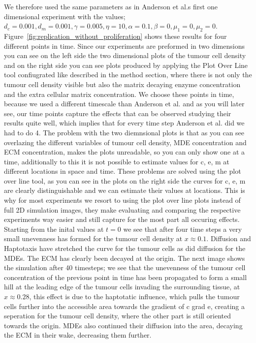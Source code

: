 We therefore used the same parameters as in Anderson et al.s first one dimensional experiment with the values; $d_c = 0.001, d_m = 0.001, \gamma = 0.005, \eta = 10, \alpha = 0.1, \beta = 0, \mu_1 = 0, \mu_2 = 0$. Figure~\ref{fig:replication_without_proliferation} shows these results for four different points in time. Since our experiments are preformed in two dimensions you can see on the left side the two dimensional plots of the tumour cell density and on the right side you can see plots produced by applying the Plot Over Line tool confiugrated like described in the method section, where there is not only the tumour cell density visible but also the matrix decaying enzyme concentration and the extra cellular matrix concentration. We choose these points in time, because we used a different timescale than Anderson et al. and as you will later see, our time points capture the effects that can be observed studying their results quite well, which implies that for every time step Anderson et al. did we had to do 4. The problem with the two diemnsional plots is that as you can see overlazing the different variables of tumour cell density, MDE concentration and ECM concentration, makes the plots unreadable, so you can only show one at a time, additionally to this it is not possible to estimate values for c, e, m at different locations in space and time. These problems are solved using the plot over line tool, as you can see in the plots on the right side the curves for c, e, m are clearly distinguishable and we can estimate their values at locations. This is why for most experiments we resort to using the plot over line plots instead of full 2D simulation images, they make evaluating and comparing the respective experiments way easier and still capture for the most part all occuring effects. 
Starting from the inital values at $t=0$ we see that after four time steps a very small unevenness has formed for the tumour cell density at $x\approx 0.1$. Diffusion and Haptotaxis have stretched the curve for the tumour cells as did diffusion for the MDEs. The ECM has clearly been decayed at the origin.
The next image shows the simulation after 40 timesteps; we see that the unevenness of the tumour cell concentration of the previous point in time has been propagated to form a small hill at the leading edge of the tumour cells invading the surrounding tissue, at $x\approx 0.28$, this effect is due to the haptotatic influence, which pulls the tumour cells further into the accessible area towards the gradient of c grad e, creating a seperation for the tumour cell density, where the other part is still oriented towards the origin. MDEs also continued their diffusion into the area, decaying the ECM in their wake, decreasing them further. 
